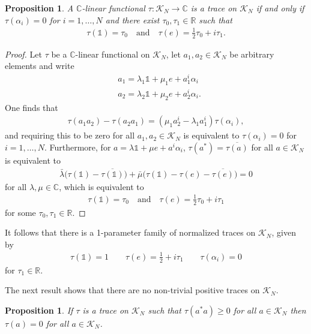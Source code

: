 \documentclass{amsart}
\newcommand{\reals}{\mathbb{R}}
\newcommand{\complex}{\mathbb{C}}
\newcommand{\paraa}[1]{\big(#1\big)}
\newtheorem{proposition}[theorem]{Proposition}
\theoremstyle{definition}
\theoremstyle{remark}
\numberwithin{equation}{section}
\newcommand{\K}{\mathcal{K}}
\renewcommand{\mid}{\mathds{1}}
\newcommand{\KN}{\K_N}
\newcommand{\qand}{\quad\text{and}\quad}
\begin{document}
\begin{proposition}\label{prop:traces.KN}
  A $\complex$-linear functional $\tau:\KN\to\complex$ is a trace on $\KN$ if
  and only if $\tau(\alpha_i)=0$ for $i=1,\ldots,N$ and there exist
  $\tau_0,\tau_1\in\reals$ such that
  \begin{align*}
    \tau(\mid) = \tau_0\qand
    \tau(e) = \tfrac{1}{2}\tau_0+i\tau_1.
  \end{align*}
\end{proposition}

\begin{proof}
  Let $\tau$ be a $\complex$-linear functional on $\KN$, let
  $a_1,a_2\in\KN$ be arbitrary elements and write
  \begin{align*}
    &a_1 = \lambda_1\mid+\mu_1e+a_1^i\alpha_i\\
    &a_2 = \lambda_2\mid+\mu_2e+a_2^i\alpha_i.
  \end{align*}
  One finds that
  \begin{align*}
    \tau(a_1a_2)-\tau(a_2a_1)= (\mu_1a_2^i-\lambda_1a_1^i)\tau(\alpha_i),
  \end{align*}
  and requiring this to be zero for all $a_1,a_2\in\KN$ is equivalent
  to $\tau(\alpha_i)=0$ for $i=1,\ldots,N$. Furthermore, for
  $a=\lambda\mid+\mu e+a^i\alpha_i$, $\tau(a^\ast)=\overline{\tau(a)}$ for all $a\in\KN$
  is equivalent to
  \begin{align*}
    \bar{\lambda}\paraa{\tau(\mid)-\overline{\tau(\mid)}}
    +\bar{\mu}\paraa{\tau(\mid)-\tau(e)-\overline{\tau(e)}}=0
  \end{align*}
  for all $\lambda,\mu\in\complex$, which is equivalent to
  \begin{align*}
    \tau(\mid)=\tau_0\qand \tau(e)=\tfrac{1}{2}\tau_0+i\tau_1 
  \end{align*}
  for some $\tau_0,\tau_1\in\reals$.
\end{proof}

\noindent 
It follows that there is a 1-parameter family of normalized traces on
$\KN$, given by
\begin{align*}
  \tau(\mid) = 1\qquad \tau(e) = \tfrac{1}{2}+i\tau_1\qquad \tau(\alpha_i)=0
\end{align*}
for $\tau_1\in\reals$.

The next result shows that there are no non-trivial positive traces on
$\KN$.

\begin{proposition}
  If $\tau$ is a trace on $\KN$ such that $\tau(a^\ast a)\geq 0$ for
  all $a\in\KN$ then $\tau(a)=0$ for all $a\in\KN$.
\end{proposition}
\end{document}
